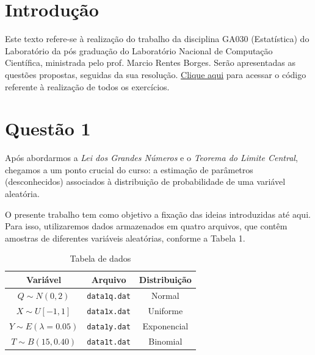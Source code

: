 \documentclass[]{abntex2}
\begin{document}
\frenchspacing 

\maketitle

\section*{\textbf{Introdução}}

Este texto refere-se à realização do trabalho da disciplina GA030 (Estatística) do Laboratório da pós graduação do Laboratório Nacional de Computação Científica, ministrada pelo prof. Marcio Rentes Borges. Serão apresentadas as questões propostas, seguidas da sua resolução. \href{https://github.com/lorran-araujo/LNCC/blob/main/disciplinas/estatistica/trab1/trab.ipynb}{Clique aqui} para acessar o código referente à realização de todos os exercícios.

\section*{\textbf{Questão 1}}
\noindent Após abordarmos a \textit{Lei dos Grandes Números} e o \textit{Teorema do Limite Central}, chegamos a um ponto crucial do curso: a estimação de parâmetros (desconhecidos) associados à distribuição de probabilidade de uma variável aleatória.

\noindent O presente trabalho tem como objetivo a fixação das ideias introduzidas até aqui. Para isso, utilizaremos dados armazenados em quatro arquivos, que contêm amostras de diferentes variáveis aleatórias, conforme a Tabela 1.

\begin{table}[H]
    \centering
    \begin{tabular}{|c|c|c|}
        \hline
        \textbf{Variável} & \textbf{Arquivo} & \textbf{Distribuição} \\
        \hline
        $Q \sim N(0, 2)$ & \texttt{data1q.dat} & Normal \\
        $X \sim U[-1, 1]$ & \texttt{data1x.dat} & Uniforme \\
        $Y \sim E(\lambda = 0.05)$ & \texttt{data1y.dat} & Exponencial \\
        $T \sim B(15, 0.40)$ & \texttt{data1t.dat} & Binomial \\
        \hline
    \end{tabular}
    \caption{Tabela de dados}
    \label{tab:dados}
\end{table}
\end{document}
